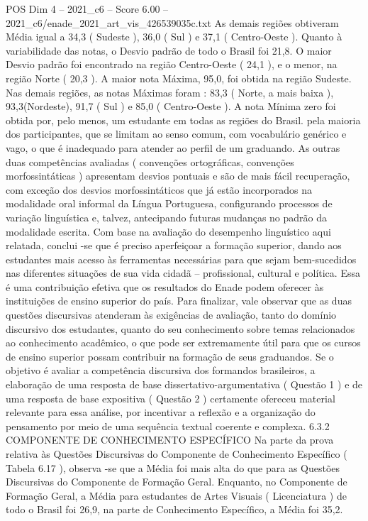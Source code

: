 \begin{textsample}{POS Dim 4 – 2021\_c6 – Score 6.00 – 2021\_c6/enade\_2021\_art\_vis\_426539035c.txt}
As demais regiões obtiveram Média igual a 34,3 ( Sudeste ), 36,0 ( Sul ) e 37,1 ( Centro-Oeste ).
Quanto à variabilidade das notas, o Desvio padrão de todo o Brasil foi 21,8.
O maior Desvio padrão foi encontrado na região Centro-Oeste ( 24,1 ), e o menor, na região Norte ( 20,3 ).
A maior nota Máxima, 95,0, foi obtida na região Sudeste.
Nas demais regiões, as notas Máximas foram : 83,3 ( Norte, a mais baixa ), 93,3(Nordeste), 91,7 ( Sul ) e 85,0 ( Centro-Oeste ).
A nota Mínima zero foi obtida por, pelo menos, um estudante em todas as regiões do Brasil. pela maioria dos participantes, que se limitam ao senso comum, com vocabulário genérico e vago, o que é inadequado para atender ao perfil de um graduando.
As outras duas competências avaliadas ( convenções ortográficas, convenções morfossintáticas ) apresentam desvios pontuais e são de mais fácil recuperação, com exceção dos desvios morfossintáticos que já estão incorporados na modalidade oral informal da Língua Portuguesa, configurando processos de variação linguística e, talvez, antecipando futuras mudanças no padrão da modalidade escrita.
Com base na avaliação do desempenho linguístico aqui relatada, conclui -se que é preciso aperfeiçoar a formação superior, dando aos estudantes mais acesso às ferramentas necessárias para que sejam bem-sucedidos nas diferentes situações de sua vida cidadã – profissional, cultural e política.
Essa é uma contribuição efetiva que os resultados do Enade podem oferecer às instituições de ensino superior do país.
Para finalizar, vale observar que as duas questões discursivas atenderam às exigências de avaliação, tanto do domínio discursivo dos estudantes, quanto do seu conhecimento sobre temas relacionados ao conhecimento acadêmico, o que pode ser extremamente útil para que os cursos de ensino superior possam contribuir na formação de seus graduandos.
Se o objetivo é avaliar a competência discursiva dos formandos brasileiros, a elaboração de uma resposta de base dissertativo-argumentativa ( Questão 1 ) e de uma resposta de base expositiva ( Questão 2 ) certamente ofereceu material relevante para essa análise, por incentivar a reflexão e a organização do pensamento por meio de uma sequência textual coerente e complexa. 6.3.2 COMPONENTE DE CONHECIMENTO ESPECÍFICO Na parte da prova relativa às Questões Discursivas do Componente de Conhecimento Específico ( Tabela 6.17 ), observa -se que a Média foi mais alta do que para as Questões Discursivas do Componente de Formação Geral.
Enquanto, no Componente de Formação Geral, a Média para estudantes de Artes Visuais ( Licenciatura ) de todo o Brasil foi 26,9, na parte de Conhecimento Específico, a Média foi 35,2.

\end{textsample}
